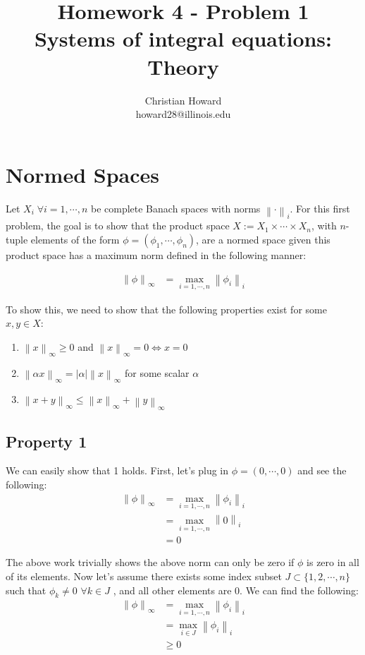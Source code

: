 \documentclass{article}[11pt]
\title{Homework 4 - Problem 1\\ Systems of integral equations: Theory }
\author{Christian Howard \\ howard28@illinois.edu }
\date{}
\newcommand{\norm}[1]{\left\lVert#1\right\rVert}
\begin{document}
   \maketitle
   
   \newpage
   
   \tableofcontents
   
   \newpage
  
   \section{Normed Spaces}
   Let $X_i \; \forall i = 1, \cdots, n$ be complete Banach spaces with norms $\norm{\cdot}_i$. For this first problem, the goal is to show that the product space $X := X_1 \times \cdots \times X_n $, with $n$-tuple elements of the form $\phi = \left( \phi_1, \cdots, \phi_n \right)$, are a normed space given this product space has a maximum norm defined in the following manner:
   
   \begin{align}
   \norm{\phi}_{\infty} &= \max_{i = 1, \cdots, n} \norm{\phi_i}_i
   \end{align} 
   
   To show this, we need to show that the following properties exist for some $x,y \in X$:
   \begin{enumerate}
   	\item $\norm{x}_\infty \geq 0$ and $\norm{x}_\infty = 0 \iff x = 0$
   	\item $\norm{\alpha x}_\infty = |\alpha| \norm{x}_\infty$ for some scalar $\alpha$
   	\item $\norm{x + y}_\infty \leq \norm{x}_\infty + \norm{y}_\infty$
   \end{enumerate}

\subsection{Property 1}
	We can easily show that 1 holds. First, let's plug in $\phi = \left(0, \cdots, 0\right)$ and see the following:
	\begin{align*}
	\norm{\phi}_{\infty} &= \max_{i = 1, \cdots, n} \norm{\phi_i}_i \\
	&= \max_{i = 1, \cdots, n} \norm{0}_i \\
	&= 0
	\end{align*}
	
	The above work trivially shows the above norm can only be zero if $\phi$ is zero in all of its elements. Now let's assume there exists some index subset $J \subset \lbrace 1, 2, \cdots, n\rbrace$ such that $\phi_k \neq 0$ $\forall k \in J$ , and all other elements are 0. We can find the following:
	\begin{align*}
	\norm{\phi}_{\infty} &= \max_{i = 1, \cdots, n} \norm{\phi_i}_i \\
	&= \max_{i \in J} \norm{\phi_i}_i  \\
	&\geq 0
	\end{align*}
   
\end{document}
